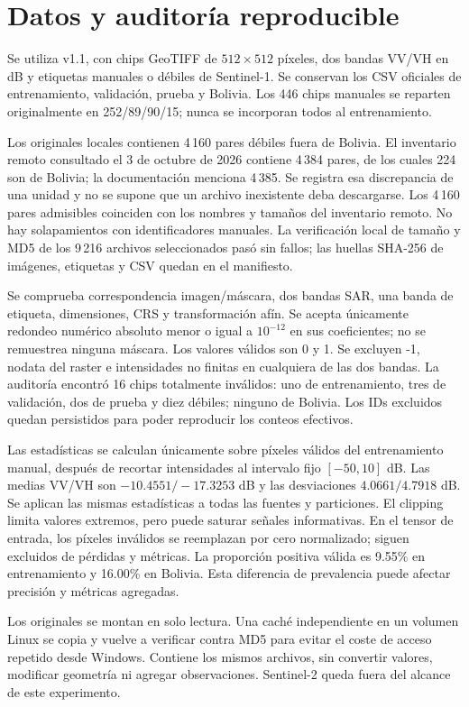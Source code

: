 \section{Datos y auditoría reproducible}
Se utiliza v1.1, con chips GeoTIFF de $512\times512$ píxeles, dos bandas VV/VH en dB y
etiquetas manuales o débiles de Sentinel-1. Se conservan los CSV oficiales de entrenamiento,
validación, prueba y Bolivia. Los 446 chips manuales se reparten originalmente en
252/89/90/15; nunca se incorporan todos al entrenamiento.

Los originales locales contienen 4\,160 pares débiles fuera de Bolivia. El inventario
remoto consultado el 3 de octubre de 2026 contiene 4\,384 pares, de los cuales 224 son de
Bolivia; la documentación menciona 4\,385. Se registra esa discrepancia de una unidad y no
se supone que un archivo inexistente deba descargarse. Los 4\,160 pares admisibles coinciden
con los nombres y tamaños del inventario remoto. No hay solapamientos con identificadores
manuales. La verificación local de tamaño y MD5 de los 9\,216 archivos seleccionados pasó
sin fallos; las huellas SHA-256 de imágenes, etiquetas y CSV quedan en el manifiesto.

Se comprueba correspondencia imagen/máscara, dos bandas SAR, una banda de etiqueta,
dimensiones, CRS y transformación afín. Se acepta únicamente redondeo numérico absoluto
menor o igual a $10^{-12}$ en sus coeficientes; no se remuestrea ninguna máscara. Los valores
válidos son 0 y 1. Se excluyen -1, nodata del raster e intensidades no finitas en cualquiera
de las dos bandas. La auditoría encontró 16 chips totalmente inválidos: uno de entrenamiento,
tres de validación, dos de prueba y diez débiles; ninguno de Bolivia. Los IDs excluidos
quedan persistidos para poder reproducir los conteos efectivos.


Las estadísticas se calculan únicamente sobre píxeles válidos del entrenamiento manual,
después de recortar intensidades al intervalo fijo $[-50,10]$ dB. Las medias VV/VH son
$-10.4551/-17.3253$ dB y las desviaciones $4.0661/4.7918$ dB. Se aplican las mismas
estadísticas a todas las fuentes y particiones. El clipping limita valores extremos, pero
puede saturar señales informativas. En el tensor de entrada, los píxeles inválidos se
reemplazan por cero normalizado; siguen excluidos de pérdidas y métricas.
La proporción positiva válida es 9.55\% en entrenamiento y 16.00\% en Bolivia.
Esta diferencia de prevalencia puede afectar precisión y métricas agregadas.

Los originales se montan en solo lectura. Una caché independiente en un volumen Linux
se copia y vuelve a verificar contra MD5 para evitar el coste de acceso repetido desde
Windows. Contiene los mismos archivos, sin convertir valores, modificar geometría ni
agregar observaciones. Sentinel-2 queda fuera del alcance de este experimento.

